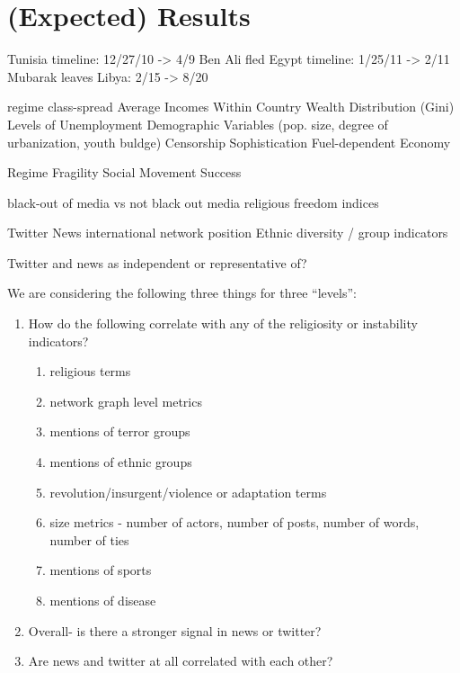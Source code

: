 
\section{(Expected) Results}

  Tunisia timeline: 12/27/10 -> 4/9 Ben Ali fled
    Egypt timeline: 1/25/11 -> 2/11 Mubarak leaves
    Libya: 2/15 -> 8/20


regime 
class-spread
Average Incomes Within Country
Wealth Distribution (Gini)
Levels of Unemployment
Demographic Variables (pop. size, degree of urbanization, youth buldge)
Censorship Sophistication 
Fuel-dependent Economy 

Regime Fragility 	
Social Movement Success 

black-out of media vs not black out media 
religious freedom indices

Twitter
News 
international network position
Ethnic diversity / group indicators

Twitter and news as independent or representative of?



We are considering the following three things for three ``levels'':

\begin{enumerate}

\item How do the following correlate with any of the religiosity or instability indicators?
    \begin{enumerate}
        \item religious terms
        \item network graph level metrics
        \item mentions of terror groups
        \item mentions of ethnic groups
        \item revolution/insurgent/violence or adaptation terms
        \item size metrics - number of actors, number of posts,
        number of words, number of ties
        \item mentions of sports
        \item mentions of disease
    \end{enumerate}

\item Overall- is there a stronger signal in news or twitter?  

\item Are news and twitter at all correlated with each other?


\end{enumerate}

